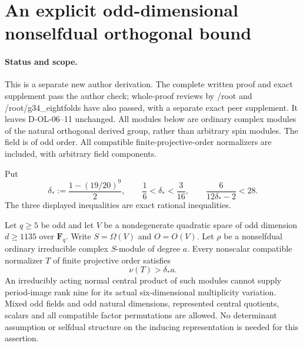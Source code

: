\section{An explicit odd-dimensional nonselfdual orthogonal bound}
\label{sec:orthogonal-odd-nonselfdual}

\paragraph{Status and scope.}
This is a separate new author derivation.  The complete written
proof and exact supplement pass the author check; whole-proof
reviews by /root and /root/g34\_eightfolds have also passed, with
a separate exact peer supplement.  It leaves D-OL-06--11 unchanged.  All modules
below are ordinary complex modules of the natural orthogonal
derived group, rather than arbitrary spin modules.  The field is
of odd order.  All compatible finite-projective-order normalizers
are included, with arbitrary field components.

Put
\[
 \delta_*:=\frac{1-(19/20)^9}{2},\qquad
             \frac16<\delta_*<\frac3{16},\qquad
             \frac6{12\delta_*-2}<28.                       \tag{OO.1}
\]
The three displayed inequalities are exact rational inequalities.

\begin{theorem}[D-OL-12]
\label{D-OL-12}
Let $q\ge5$ be odd and let $V$ be a nondegenerate quadratic
space of odd dimension $d\ge1135$ over $\mathbf F_q$.
Write $S=\Omega(V)$ and $O=O(V)$.  Let $\rho$ be a nonselfdual
ordinary irreducible complex $S$-module of degree $a$.
Every nonscalar compatible normalizer $T$ of finite projective
order satisfies
\[
                         \nu(T)>\delta_*a.                  \tag{OO.2}
\]
An irreducibly acting normal central product of such modules
cannot supply period-image rank nine for its actual six-dimensional
multiplicity variation.  Mixed odd fields and odd natural
dimensions, represented central quotients, scalars and all
compatible factor permutations are allowed.  No determinant
assumption or selfdual structure on the inducing representation
is needed for this assertion.
\end{theorem}

